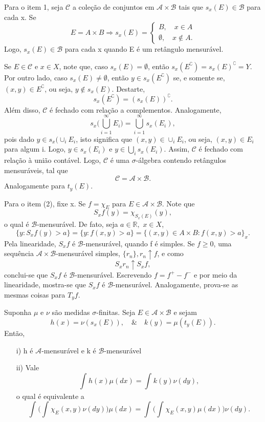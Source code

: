 \documentclass[MeasureTheory/measure_theory.tex]{subfiles}
\begin{document}
\begin{proof*}
	Para o item 1, seja \(\mathcal{C}\) a coleção de conjuntos em \(\mathcal{A}\times \mathcal{B}\) tais que \(s_x(E)\in \mathcal{B}\) para cada x. Se
	\[
		E = A\times B \Rightarrow s_x(E)  = \left\{\begin{array}{ll}
			B,\quad x\in A \\
			\emptyset ,\quad x\not\in A.
		\end{array}\right.
	\]
	Logo, \(s_x(E)\in \mathcal{B}\) para cada x quando E é um retângulo mensurável.

	Se \(E\in \mathcal{C}\) e \(x\in X\), note que, caso \(s_x(E) = \emptyset \), então \(s_x(E ^{\complement}) = s_x(E)^{\complement} = Y.\) Por outro lado, caso \(s_x(E)\neq\emptyset\),
	então \(y\in s_x(E ^{\complement})\) se, e somente se, \((x, y)\in E ^{\complement}\), ou seja, \(y\not\in s_x(E).\) Destarte,
	\[
		s_x(E ^{\complement}) = (s_x(E))^{\complement}.
	\]
	Além disso, \(\mathcal{C}\) é fechado com relação a complementos. Analogamente,
	\[
		s_x \biggl( \bigcup_{i=1}^{\infty}E_{i}\biggr) = \bigcup_{i=1}^{\infty}s_x(E_{i}),
	\]
	pois dado \(y\in s_x(\cup_i E_{i}\), isto significa que \((x, y)\in \cup_i E_{i}\), ou seja, \((x, y)\in E_{i}\) para algum i. Logo, \(y\in s_x(E_{i})\) e \(y\in \bigcup_{i}^{}s_{x}(E_{i}).\)
	Assim, \(\mathcal{C}\) é fechado com relação à união contável. Logo, \(\mathcal{C}\) é uma \(\sigma \)-álgebra contendo retângulos mensuráveis, tal que
	\[
		\mathcal{C} = \mathcal{A}\times \mathcal{B}.
	\]
	Analogamente para \(t_y(E).\)

	Para o item (2), fixe x. Se \(f=\chi_{E}\) para \(E\in \mathcal{A}\times \mathcal{B}.\) Note que
	\[
		S_xf(y) = \chi_{S_x(E)}(y),
	\]
	o qual é \(\mathcal{B}\)-mensurável. De fato, seja \(a\in \mathbb{R},\) \(x\in X\),
	\[
		\{y: S_{x}f(y) > a\} = \{y:f(x, y) > a\} = \{(x, y)\in A\times B: f(x, y) > a\}_{x}.
	\]
	Pela linearidade, \(S_{x}f\) é \(\mathcal{B}\)-mensurável, quando f é simples. Se \(f\geq 0\), uma sequência \(\mathcal{A}\times \mathcal{B}\)-mensurável simples, \(\{r_{n}\}, r_{n}\uparrow f\), e como
	\[
		S_xr_{n}\uparrow S_{x}f,
	\]
	conclui-se que \(S_xf\) é \(\mathcal{B}\)-mensurável. Escrevendo \(f=f^{+}-f^{-}\) e por meio da linearidade, mostra-se que \(S_{x}f\) é \(\mathcal{B}\)-mensurável. Analogamente, prova-se as mesmas coisas
	para \(T_{y}f\). \qedsymbol
\end{proof*}
\begin{prop*}

	Suponha \(\mu \) e \(\nu\) são medidas \(\sigma \)-finitas. Seja \(E\in \mathcal{A}\times \mathcal{B}\) e sejam
	\[
		h(x) = \nu(s_x(E)),\quad\&\quad k(y) = \mu (t_y(E)).
	\]
	Então,
	\begin{itemize}
		\item[i)] h é \(\mathcal{A}\)-mensurável e k é \(\mathcal{B}\)-mensurável
		\item[ii)] Vale
		      \[
			      \int_{}h(x) \mu (dx) = \int_{}^{}k(y)\nu(dy),
		      \]
		      o qual é equivalente a
		      \[
			      \int_{}^{}\biggl(\int_{}^{}\chi_{E}(x, y)\nu(dy)\biggr)\mu (dx) = \int_{}^{}\biggl(\int_{}^{}\chi_{E}(x, y)\mu (dx)\biggr)\nu(dy).
		      \]
	\end{itemize}
\end{prop*}
\end{document}
